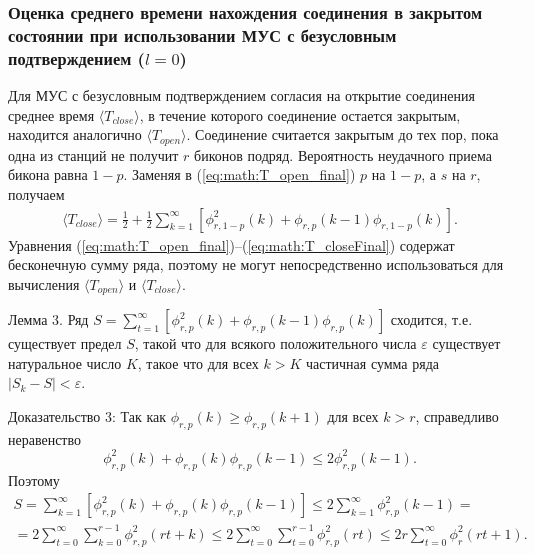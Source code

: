 \subsubsection{Оценка среднего времени нахождения соединения в закрытом состоянии при использовании МУС с безусловным подтверждением ($l=0$)}
Для МУС с безусловным подтверждением согласия на открытие соединения среднее время $\langle T_{close} \rangle$, в течение которого соединение остается закрытым, находится аналогично $\langle T_{open} \rangle$. Соединение считается закрытым до тех пор, пока одна из станций не получит $r$ биконов подряд. Вероятность неудачного приема бикона равна $1-p$. Заменяя в (\ref{eq:math:T_open_final}) $p$ на $1-p$, а $s$ на $r$, получаем
\begin{equation}
\label{eq:math:T_closeFinal}
\begin{array}{c}
\langle T_{close} \rangle = \frac{1}{2} + \frac{1}{2} \sum \limits^{\infty}_{k=1} \left[ \phi_{r,1-p}^2(k)  + \phi_{r,p}(k-1) \phi_{r,1-p}(k) \right].
\end{array}
\end{equation}
Уравнения (\ref{eq:math:T_open_final})--(\ref{eq:math:T_closeFinal}) содержат бесконечную сумму ряда, поэтому не могут непосредственно использоваться для вычисления $\langle T_{open} \rangle$ и $\langle T_{close} \rangle$.  

Лемма 3.
Ряд $ S = \sum \limits^{\infty}_{t=1} \left[ \phi_{r,p}^2(k)  + \phi_{r,p}(k-1) \phi_{r,p}(k) \right] $ сходится, т.е. существует предел $S$, такой что для всякого положительного числа $\varepsilon$ существует натуральное число $K$, такое что для всех $k>K$ частичная сумма ряда $ | S_k - S| < \varepsilon$.

Доказательство 3:
Так как $\phi_{r,p}(k) \geqslant \phi_{r,p}(k+1)$ для всех $k>r$, справедливо неравенство
\[
 \phi_{r,p}^2(k)  + \phi_{r,p}(k) \phi_{r,p}(k-1) \leqslant  2\phi_{r,p}^2(k-1).
\]
Поэтому
\[
\begin{array}{c}
 S = \sum \limits^{\infty}_{k=1} \left[ \phi_{r,p}^2(k)  + \phi_{r,p}(k) \phi_{r,p}(k-1) \right] \leqslant  2\sum \limits^{\infty}_{k=1} \phi_{r,p}^2(k-1) = \\
=2\sum \limits^{\infty}_{t=0}\sum \limits^{r-1}_{k=0} \phi_{r,p}^2(rt+k) \leqslant  2\sum \limits^{\infty}_{t=0}\sum \limits^{r-1}_{t=0} \phi_{r,p}^2(rt)
 \leqslant  2r \sum \limits^{\infty}_{t=0} \phi_{r}^2(rt+1).
\end{array}
\]

